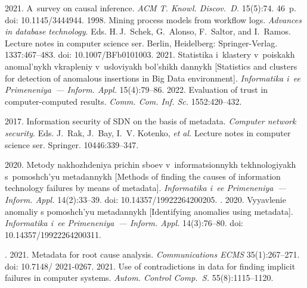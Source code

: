 \begin{multicols}{2}
{{\begin{thebibliography}{99}
 2021. A~survey on causal inference. 
\textit{ACM T. Knowl. Discov.~D.} 15(5):74. 46~p. doi: 10.1145/3444944.
 1998. Mining process models from workflow 
logs. \textit{Advances in database technology}. Eds. H.\,J.~Schek, G.~Alonso, F.~Saltor, and 
I.~Ramos. Lecture notes in computer science ser. Berlin, Heidelberg: Springer-Verlag. 1337:467--483.
doi: 10.1007/BFb0101003.
 2021. Statistika i~klastery v~poiskakh anomal'nykh vkrapleniy v~usloviyakh 
bol'shikh dannykh [Statistics and clusters for detection of anomalous insertions in Big Data 
environment]. \textit{Informatika i~ee Primeneniya~--- Inform. Appl.} 15(4):79--86.
 2022. Evaluation of trust in 
computer-computed results.  \textit{Comm. Com. Inf. Sc.} 1552:420--432.

 2017. Information 
security of SDN on the basis of metadata. \textit{Computer network security}. Eds. J.~Rak, J.~Bay, 
I.~V. Kotenko, \textit{et al.} Lecture notes in computer science ser. Springer. 10446:339--347.

 2020. Metody 
nakhozhdeniya prichin sboev v~informatsionnykh tekhnologiyakh s~pomoshch'yu metadannykh 
[Methods of finding the causes of information technology failures by means of metadata]. 
\textit{Informatika i~ee Primeneniya~--- Inform. Appl.} 14(2):33--39. doi: 10.14357/19922264200205.
. 2020. Vyyavlenie 
anomaliy s pomoshch'yu metadannykh [Identifying anomalies using metadata]. \textit{Informatika 
i~ee Primeneniya~--- Inform. Appl.} 14(3):76--80. doi: 10.14357/19922264200311.

. 2021. Metadata for 
root cause analysis. \textit{Communications ECMS} 35(1):267--271. doi: 10.7148/ 2021-0267.
 2021. Use of 
contradictions in data for finding implicit failures in computer systems. \textit{Autom. Control  
Comp.~S.} 55(8):1115--1120.
\end{thebibliography}

 }
 }

\end{multicols}

